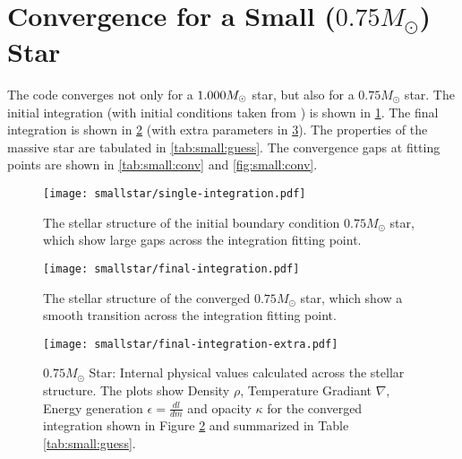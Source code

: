 \documentclass[10pt]{article}
\begin{document}
\clearpage
\section{Convergence for a Small ($0.75 M_\odot$) Star}
The code converges not only for a $1.000 M_\odot$ star, but also for a $0.75 M_\odot$ star. The initial integration (with initial conditions taken from \citet{hansen2004stellar}) is shown in \cref{fig:small:firstint}. The final integration is shown in \cref{fig:small:finalint} (with extra parameters in \cref{fig:small:finalintextra}). The properties of the massive star are tabulated in \cref{tab:small:guess}. The convergence gaps at fitting points are shown in \cref{tab:small:conv} and \cref{fig:small:conv}. 

 \begin{figure}[htbp]
    \centering
    \texttt{[image: smallstar/single-integration.pdf]}
    \caption[$0.75 M_\odot$ Star: Initial Integration]{The stellar structure of the initial boundary condition $0.75 M_\odot$ star, which show large gaps across the integration fitting point.}
    \label{fig:small:firstint}
 \end{figure}
 
 \begin{table}[htbp]
\begin{center}
\label{tab:small:guess}

\end{center}
\end{table}
 
 \begin{figure}[htbp]
    \centering
    \texttt{[image: smallstar/final-integration.pdf]}
    \caption[$0.75 M_\odot$ Star: Converged Integration]{The stellar structure of the converged $0.75 M_\odot$ star, which show a smooth transition across the integration fitting point.}
    \label{fig:small:finalint}
 \end{figure}
 

 \begin{figure}[htbp]
    \centering
    \texttt{[image: smallstar/final-integration-extra.pdf]}
    \caption[$0.75 M_\odot$ Star: Properties of the Converged Integration]{$0.75 M_\odot$ Star: Internal physical values calculated across the stellar structure. The plots show Density $\rho$, Temperature Gradiant $\nabla$, Energy generation $\epsilon = \frac{dl}{dm}$ and opacity $\kappa$ for the converged integration shown in Figure \ref{fig:small:finalint} and summarized in Table \ref{tab:small:guess}. }
    \label{fig:small:finalintextra}
 \end{figure}
\end{document}
